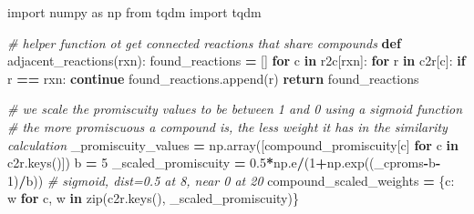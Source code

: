 \documentclass[
]{book}
\newenvironment{Shaded}{\begin{snugshade}}{\end{snugshade}}
\newcommand{\BuiltInTok}[1]{#1}
\newcommand{\CommentTok}[1]{\textcolor[rgb]{0.56,0.35,0.01}{\textit{#1}}}
\newcommand{\ControlFlowTok}[1]{\textcolor[rgb]{0.13,0.29,0.53}{\textbf{#1}}}
\newcommand{\DecValTok}[1]{\textcolor[rgb]{0.00,0.00,0.81}{#1}}
\newcommand{\FloatTok}[1]{\textcolor[rgb]{0.00,0.00,0.81}{#1}}
\newcommand{\ImportTok}[1]{#1}
\newcommand{\KeywordTok}[1]{\textcolor[rgb]{0.13,0.29,0.53}{\textbf{#1}}}
\newcommand{\NormalTok}[1]{#1}
\newcommand{\OperatorTok}[1]{\textcolor[rgb]{0.81,0.36,0.00}{\textbf{#1}}}
\begin{document}
\begin{Shaded}
\begin{Highlighting}[numbers=left,,]
\ImportTok{import}\NormalTok{ numpy }\ImportTok{as}\NormalTok{ np}
\ImportTok{from}\NormalTok{ tqdm }\ImportTok{import}\NormalTok{ tqdm}

\CommentTok{\# helper function ot get connected reactions that share compounds}
\KeywordTok{def}\NormalTok{ adjacent\_reactions(rxn):}
\NormalTok{    found\_reactions }\OperatorTok{=}\NormalTok{ []}
    \ControlFlowTok{for}\NormalTok{ c }\KeywordTok{in}\NormalTok{ r2c[rxn]:}
        \ControlFlowTok{for}\NormalTok{ r }\KeywordTok{in}\NormalTok{ c2r[c]:}
            \ControlFlowTok{if}\NormalTok{ r }\OperatorTok{==}\NormalTok{ rxn: }\ControlFlowTok{continue}
\NormalTok{            found\_reactions.append(r)}
    \ControlFlowTok{return}\NormalTok{ found\_reactions}

\CommentTok{\# we scale the promiscuity values to be between 1 and 0 using a sigmoid function}
\CommentTok{\# the more promiscuous a compound is, the less weight it has in the similarity calculation}
\NormalTok{\_promiscuity\_values }\OperatorTok{=}\NormalTok{ np.array([compound\_promiscuity[c] }\ControlFlowTok{for}\NormalTok{ c }\KeywordTok{in}\NormalTok{ c2r.keys()])}
\NormalTok{b }\OperatorTok{=} \DecValTok{5}
\NormalTok{\_scaled\_promiscuity }\OperatorTok{=} \FloatTok{0.5}\OperatorTok{*}\NormalTok{np.e}\OperatorTok{/}\NormalTok{(}\DecValTok{1}\OperatorTok{+}\NormalTok{np.exp((\_cproms}\OperatorTok{{-}}\NormalTok{b}\OperatorTok{{-}}\DecValTok{1}\NormalTok{)}\OperatorTok{/}\NormalTok{b)) }\CommentTok{\# sigmoid, dist=0.5 at 8, near 0 at 20}
\NormalTok{compound\_scaled\_weights }\OperatorTok{=}\NormalTok{ \{c: w }\ControlFlowTok{for}\NormalTok{ c, w }\KeywordTok{in} \BuiltInTok{zip}\NormalTok{(c2r.keys(), \_scaled\_promiscuity)\}}


\end{Highlighting}
\end{Shaded}
\end{document}
